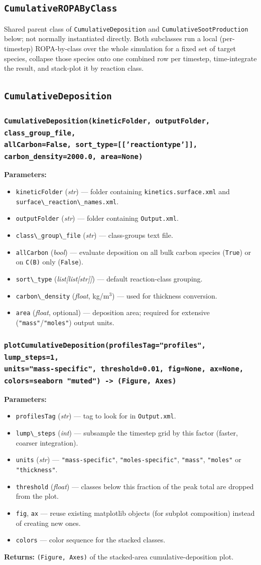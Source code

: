 \documentclass[11pt,a4paper]{report}
\newcommand{\pyclass}[1]{\subsection{\texttt{#1}}}
\newcommand{\pymethod}[1]{\subsubsection{\texttt{#1}}}
\newcommand{\returns}{\vspace{2mm}\noindent\textbf{Returns:} }
\newenvironment{params}{\vspace{1mm}\noindent\textbf{Parameters:}\begin{itemize}[leftmargin=1.1cm,label={--},itemsep=1pt,topsep=2pt]}{\end{itemize}}
\newcommand{\pkg}[1]{\lstinline|#1|}
\begin{document}
\pyclass{CumulativeROPAByClass}

Shared parent class of \pkg{CumulativeDeposition} and
\pkg{CumulativeSootProduction} below; not normally instantiated directly.
Both subclasses run a local (per-timestep) ROPA-by-class over the whole
simulation for a fixed set of target species, collapse those species onto
one combined row per timestep, time-integrate the result, and stack-plot it
by reaction class.

\pyclass{CumulativeDeposition}

\pymethod{CumulativeDeposition(kineticFolder, outputFolder, class\_group\_file, \\ allCarbon=False, sort\_type=[['reactiontype']], carbon\_density=2000.0, area=None)}

\begin{params}
\item \pkg{kineticFolder} (\textit{str}) --- folder containing
  \pkg{kinetics.surface.xml} and \pkg{surface\_reaction\_names.xml}.
\item \pkg{outputFolder} (\textit{str}) --- folder containing
  \pkg{Output.xml}.
\item \pkg{class\_group\_file} (\textit{str}) --- class-groups text file.
\item \pkg{allCarbon} (\textit{bool}) --- evaluate deposition on all bulk
  carbon species (\pkg{True}) or on \pkg{C(B)} only (\pkg{False}).
\item \pkg{sort\_type} (\textit{list[list[str]]}) --- default reaction-class
  grouping.
\item \pkg{carbon\_density} (\textit{float}, kg/m$^3$) --- used for
  thickness conversion.
\item \pkg{area} (\textit{float}, optional) --- deposition area; required
  for extensive (\pkg{"mass"}/\pkg{"moles"}) output units.
\end{params}

\pymethod{plotCumulativeDeposition(profilesTag="profiles", lump\_steps=1,\\  units="mass-specific", threshold=0.01, fig=None, ax=None, colors=seaborn "muted") -> (Figure, Axes)}

\begin{params}
\item \pkg{profilesTag} (\textit{str}) --- tag to look for in
  \pkg{Output.xml}.
\item \pkg{lump\_steps} (\textit{int}) --- subsample the timestep grid by
  this factor (faster, coarser integration).
\item \pkg{units} (\textit{str}) --- \pkg{"mass-specific"},
  \pkg{"moles-specific"}, \pkg{"mass"}, \pkg{"moles"} or \pkg{"thickness"}.
\item \pkg{threshold} (\textit{float}) --- classes below this fraction of
  the peak total are dropped from the plot.
\item \pkg{fig}, \pkg{ax} --- reuse existing matplotlib objects (for
  subplot composition) instead of creating new ones.
\item \pkg{colors} --- color sequence for the stacked classes.
\end{params}
\returns \pkg{(Figure, Axes)} of the stacked-area cumulative-deposition
plot.
\end{document}
